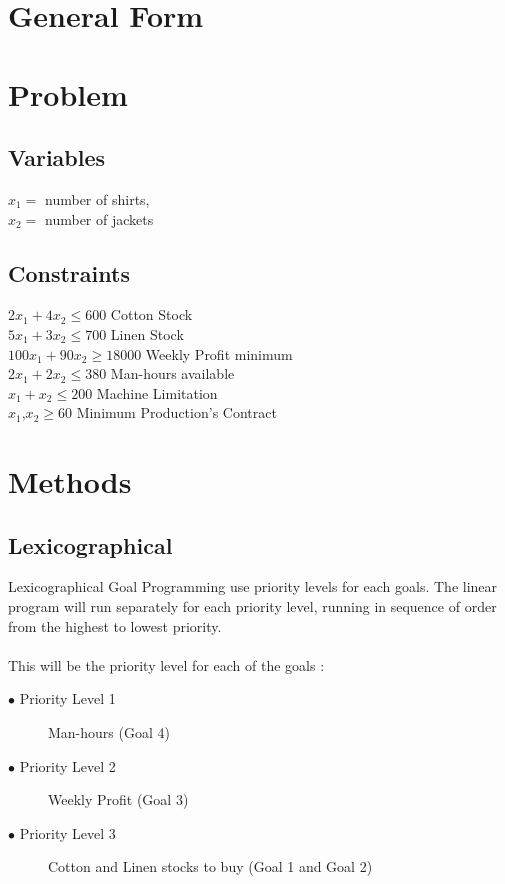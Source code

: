 \documentclass[twoside,twocolumn]{article}
\begin{document}
\section{General Form}



\section{Problem}

\subsection{Variables}
$x_1 = $ number of shirts, \\
$x_2 = $ number of jackets\\

\subsection{Constraints}
$2x_1 + 4x_2 \leq 600$ Cotton Stock \\
$5x_1 + 3x_2 \leq 700$ Linen Stock \\
$100x_1 + 90x_2 \geq 18000$ Weekly Profit minimum \\
$2x_1 + 2x_2 \leq 380$ Man-hours available \\
$x_1 + x_2 \leq 200$ Machine Limitation \\
$x_1$,$x_2 \geq 60$ Minimum Production's Contract 



\section{Methods}

\subsection{Lexicographical}

Lexicographical Goal Programming use priority levels for each goals. The linear program will run separately for each priority level, running in sequence of order from the highest to lowest priority. \\
\\
This will be the priority level for each of the goals :
\begin{description}
  \item[$\bullet$ Priority Level 1] Man-hours (Goal 4)
  \item[$\bullet$ Priority Level 2] Weekly Profit (Goal 3)
  \item[$\bullet$ Priority Level 3] Cotton and Linen stocks to buy (Goal 1 and Goal 2)
\end{description}
\end{document}
